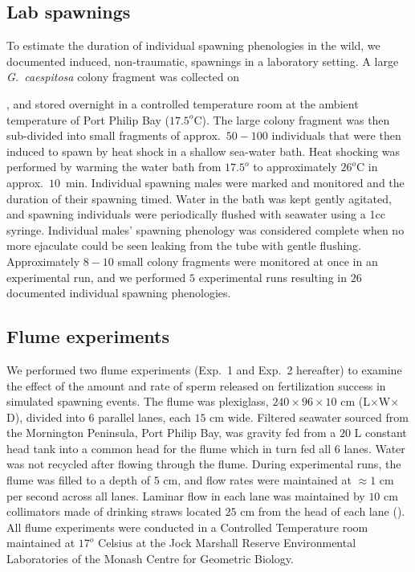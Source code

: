 \documentclass{article}
\begin{document}
	\subsection*{Lab spawnings}
	To estimate the duration of individual spawning phenologies in the wild, we documented induced, non-traumatic, spawnings in a laboratory setting. A large \textit{G.~caespitosa} colony fragment was collected on \date{16/11/16}, and stored overnight in a controlled temperature room at the ambient temperature of Port Philip Bay ($17.5^o$C). The large colony fragment was then sub-divided into small fragments of approx.~$50-100$ individuals that were then induced to spawn by heat shock in a shallow sea-water bath. Heat shocking was performed by warming the water bath from $17.5^o$ to approximately $26^o$C in approx.~$10$~min. Individual spawning males were marked and monitored and the duration of their spawning timed. Water in the bath was kept gently agitated, and spawning individuals were periodically flushed with seawater using a 1cc syringe. Individual males' spawning phenology was considered complete when no more ejaculate could be seen leaking from the tube with gentle flushing. Approximately $8-10$ small colony fragments were monitored at once in an experimental run, and we performed $5$ experimental runs resulting in $26$ documented individual spawning phenologies. 

	\subsection*{Flume experiments}
	We performed two flume experiments (Exp.~1 and Exp.~2 hereafter) to examine the effect of the amount and rate of sperm released on fertilization success in simulated spawning events. The flume was plexiglass, $240 \times 96 \times 10$ cm (L$\times$W$\times$D), divided into $6$ parallel lanes, each $15$ cm wide. Filtered seawater sourced from the Mornington Peninsula, Port Philip Bay, was gravity fed from a $20$ L constant head tank into a common head for the flume which in turn fed all $6$ lanes. Water was not recycled after flowing through the flume. During experimental runs, the flume was filled to a depth of $5$ cm, and flow rates were maintained at $\approx 1$ cm per second across all lanes. Laminar flow in each lane was maintained by $10$ cm collimators made of drinking straws located $25$ cm from the head of each lane (\citealt{YundMeidel2003}). All flume experiments were conducted in a Controlled Temperature room maintained at $17^o$ Celsius at the Jock Marshall Reserve Environmental Laboratories of the Monash Centre for Geometric Biology.
\end{document}
